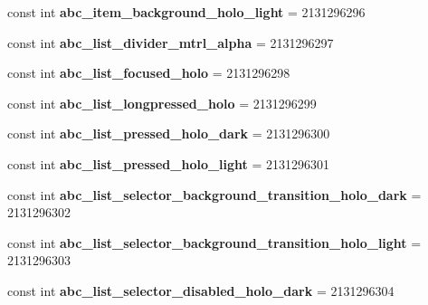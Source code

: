 \begin{DoxyCompactItemize}
const int {\bfseries abc\+\_\+item\+\_\+background\+\_\+holo\+\_\+light} = 2131296296
\item 
\mbox{\label{classst_delivery_1_1_resource_1_1_drawable_a87d937ca207b9ef1fdc5c827e47e2567}} 
const int {\bfseries abc\+\_\+list\+\_\+divider\+\_\+mtrl\+\_\+alpha} = 2131296297
\item 
\mbox{\label{classst_delivery_1_1_resource_1_1_drawable_a034d36723a384a3dc19155f95c34fd2c}} 
const int {\bfseries abc\+\_\+list\+\_\+focused\+\_\+holo} = 2131296298
\item 
\mbox{\label{classst_delivery_1_1_resource_1_1_drawable_a10af8ad8b9edfac3ca0c2bf8a53b0c19}} 
const int {\bfseries abc\+\_\+list\+\_\+longpressed\+\_\+holo} = 2131296299
\item 
\mbox{\label{classst_delivery_1_1_resource_1_1_drawable_ad8f644ebbdebf824ece98da604be3ed7}} 
const int {\bfseries abc\+\_\+list\+\_\+pressed\+\_\+holo\+\_\+dark} = 2131296300
\item 
\mbox{\label{classst_delivery_1_1_resource_1_1_drawable_a49fe5a9ab90b81e4368478df9bac090c}} 
const int {\bfseries abc\+\_\+list\+\_\+pressed\+\_\+holo\+\_\+light} = 2131296301
\item 
\mbox{\label{classst_delivery_1_1_resource_1_1_drawable_a536363fa44bf6b1551e75b9bca2d0ee8}} 
const int {\bfseries abc\+\_\+list\+\_\+selector\+\_\+background\+\_\+transition\+\_\+holo\+\_\+dark} = 2131296302
\item 
\mbox{\label{classst_delivery_1_1_resource_1_1_drawable_a264ca15b7d321e6ee15f0c7c278aff36}} 
const int {\bfseries abc\+\_\+list\+\_\+selector\+\_\+background\+\_\+transition\+\_\+holo\+\_\+light} = 2131296303
\item 
\mbox{\label{classst_delivery_1_1_resource_1_1_drawable_a813abd1fe5a16f584e6d4110672952f3}} 
const int {\bfseries abc\+\_\+list\+\_\+selector\+\_\+disabled\+\_\+holo\+\_\+dark} = 2131296304

\end{DoxyCompactItemize}
